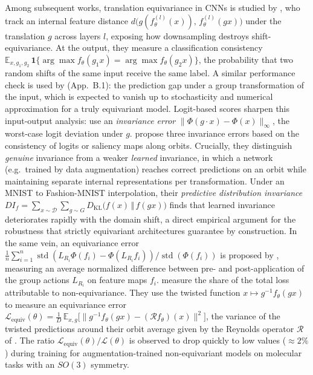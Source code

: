 \documentclass[mathematics,review,submit,moreauthors]{Definitions/mdpi}
\begin{document}
Among subsequent works, translation equivariance in CNNs is studied by \citet{zhang2019p3icml}, who track an internal feature distance $d\big(g(f_\theta^{(l)}(x)),\,f_\theta^{(l)}(gx)\big)$ under the translation $g$ across layers $l$, exposing how downsampling destroys shift-equivariance.
At the output, they measure a classification consistency $\mathbb{E}_{x,g_1,g_2}\,\mathbf{1}\{\arg\max f_\theta(g_1x)=\arg\max f_\theta(g_2x)\}$, the probability that two random shifts of the same input receive the same label.
A similar performance check is used by \citet{finzi2020p3icml} (App.~B.1): the prediction gap under a group transformation of the input, which is expected to vanish up to stochasticity and numerical approximation for a truly equivariant model.
Logit-based scores sharpen this input-output analysis: \citet{hutchinson2021p3icml} use an \emph{invariance error} $\lVert \Phi(g\cdot x) - \Phi(x)\rVert_\infty$, the worst-case logit deviation under $g$.
\citet{moskalev2023p2awtagmlt} propose three invariance errors based on the consistency of logits or saliency maps along orbits.
Crucially, they distinguish \emph{genuine} invariance from a weaker \emph{learned} invariance, in which a network (e.g.\ trained by data augmentation) reaches correct predictions on an orbit while maintaining separate internal representations per transformation.
Under an MNIST to Fashion-MNIST interpolation, their \emph{predictive distribution invariance} $DI_f = \sum_{x\sim \mathcal{D}}\sum_{g\sim G} D_{\mathrm{KL}}\big(f(x)\,\Vert\,f(gx)\big)$ finds that learned invariance deteriorates rapidly with the domain shift, a direct empirical argument for the robustness that strictly equivariant architectures guarantee by construction.
In the same vein, an equivariance error $\frac{1}{n} \sum_{i=1}^{n} \operatorname{std}(L_{R_i} \Phi(f_i) - \Phi(L_{R_i} f_i)) / \operatorname{std}(\Phi(f_i))$ is proposed by \citet{cohen2018}, measuring an average normalized difference between pre- and post-application of the group actions $L_{R_i}$ on feature maps $f_i$.
\citet{shen2026} measure the share of the total loss attributable to non-equivariance.
They use the twisted function $x\mapsto g^{-1}f_\theta(gx)$ to measure an equivariance error $\mathcal{L}_{\mathrm{equiv}}(\theta)=\frac{1}{D}\,\mathbb{E}_{x,g}\big[\lVert g^{-1}f_\theta(gx)-(\mathcal{R}f_\theta)(x)\rVert^2\big]$, the variance of the twisted predictions around their orbit average given by the Reynolds operator $\mathcal{R}$ of .
The ratio $\mathcal{L}_{\mathrm{equiv}}(\theta)/\mathcal{L}(\theta)$ is observed to drop quickly to low values ($\approx 2\%$) during training for augmentation-trained non-equivariant models on molecular tasks with an $SO(3)$ symmetry.
\end{document}
